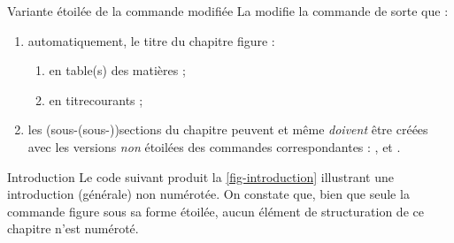 
\begin{dbremark}{Variante étoilée de la commande \protect{} modifiée}{}
  La \yatCl{} modifie la commande  de sorte que :
  \begin{enumerate}
  \item automatiquement, le titre du chapitre figure :
    \begin{enumerate}
    \item en table(s) des matières ;
    \item en \glspl{titrecourant} ;
    \end{enumerate}
  \item les (sous-(sous-))sections du chapitre peuvent et même \emph{doivent}
    être créées avec les versions \emph{non} étoilées des commandes
    correspondantes : ,  et
    .
  \end{enumerate}
\end{dbremark}

\begin{dbexample}{Introduction}{}
  Le code suivant produit la \vref{fig-introduction} illustrant une
  introduction (générale) non numérotée. On constate que, bien que seule la
  commande  figure sous sa forme étoilée, aucun élément
  de structuration de ce chapitre n'est numéroté.
\end{dbexample}

